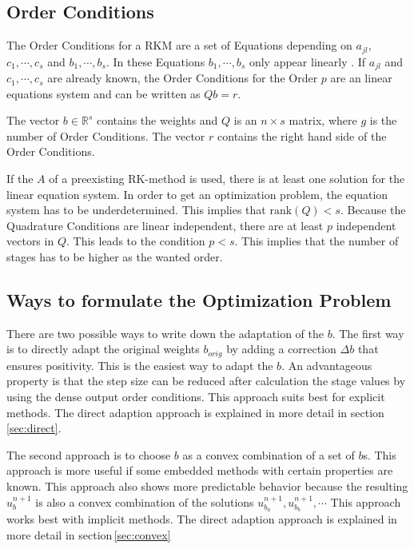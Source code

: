 \documentclass[a4paper]{scrartcl}
\numberwithin{equation}{section}
\theoremstyle{plain}
\theoremstyle{definition}
\numberwithin{theorem}{section}
\newcommand{\R}{\mathbb{R}}
\newcommand{\1}{\mathbbm{1}}
\begin{document}





\subsection{Order Conditions}\label{sec:OrderCond}

The Order Conditions for a RKM are a set of Equations depending on $a_{jl}$, $c_1,\cdots,c_s$ and $b_1,\cdots,b_s$. In these Equations $b_1,\cdots,b_s$ only appear linearly \cite{hairer_runge-kutta_1993}.
If $a_{jl}$ and $c_1,\cdots,c_s$ are already known, the Order Conditions for the Order $p$ are an linear equations system and can be written as $Q b = r$. 

The vector $b \in \R^s$ contains the weights and $Q$ is an $n \times s$ matrix, where $g$ is the number of Order Conditions. The vector $r$ contains the right hand side of the Order Conditions.

If the $A$ of a preexisting RK-method is used, there is at least one solution for the linear equation system.
In order to get an optimization problem, the equation system has to be underdetermined.
This implies that $\mathrm{rank}(Q) < s$. 
Because the Quadrature Conditions are linear independent, there are at least $p$ independent vectors in $Q$. This leads to the condition $p < s$.
This implies that the number of stages has to be higher as the wanted order.



\subsection{Ways to formulate the Optimization Problem}

There are two possible ways to write down the adaptation of the $b$. The first way is to directly adapt the original weights $b_{orig}$ by adding a correction $\Delta b$ that ensures positivity.
This is the easiest way to adapt the $b$. An advantageous property is that the step size can be reduced after calculation the stage values by using the dense output order conditions.  
This approach suits best for explicit methods.
The direct adaption approach is explained in more detail in section\,\ref{sec:direct}.

The second approach is to choose $b$ as a convex combination of a set of $b$s. This approach is more useful if some embedded methods with certain properties are known. 
This approach also shows more predictable behavior because the resulting $u^{n+1}_b$ is also a convex combination of the solutions $u^{n+1}_{b_a},u^{n+1}_{b_b},\cdots$ 
This approach works best with implicit methods.
The direct adaption approach is explained in more detail in section\,\ref{sec:convex}
\end{document}
